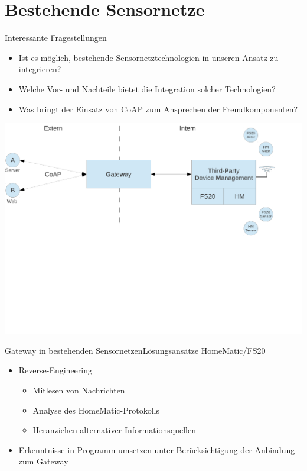 \section{Bestehende Sensornetze} %
\myContentSectionFrame[\thesection - 6]


\begin{frame}{\insertsubsection}{Interessante Fragestellungen}
	\begin{itemize}
	\item 	Ist es möglich, bestehende Sensornetztechnologien in unseren Ansatz zu integrieren?
	\item 	Welche Vor- und Nachteile bietet die Integration solcher Technologien?
	\item 	Was bringt der Einsatz von CoAP zum Ansprechen der Fremdkomponenten?
	\end{itemize}
	\vspace{0.5em}
	\begin{center}
		\includegraphics[scale=0.38]{pic/gateway_ueberblick}
	\end{center}
\end{frame}


\begin{frame}{Gateway in bestehenden Sensornetzen}{Lösungsansätze HomeMatic/FS20}
	\begin{itemize}
	\item 	Reverse-Engineering
		\begin{itemize}
		\item 	Mitlesen von Nachrichten
		\item 	Analyse des HomeMatic-Protokolls
		\item 	Heranziehen alternativer Informationsquellen
		\end{itemize}
	\item Erkenntnisse in Programm umsetzen
		unter Berücksichtigung der Anbindung zum Gateway
\end{itemize}
\end{frame}


